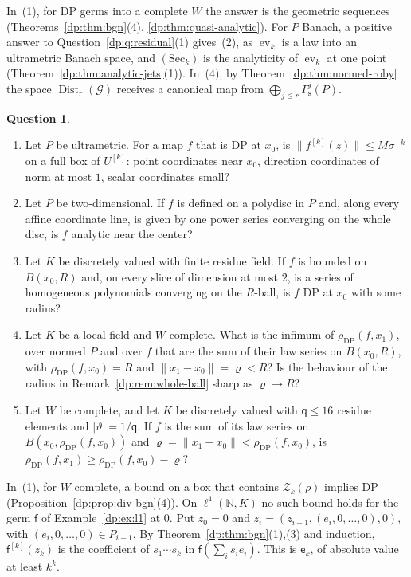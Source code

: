 \documentclass[11pt]{amsart}
\theoremstyle{definition}
\theoremstyle{remark}
\numberwithin{equation}{section}
\newcommand{\N}{\mathbb N}
\newcommand{\abs}[1]{\lvert #1\rvert}
\newcommand{\norm}[1]{\lVert #1\rVert}
\theoremstyle{plain}
\theoremstyle{definition}
\newtheorem{question}[theorem]{Question}
\theoremstyle{plain}
\newcommand{\ev}{\operatorname{ev}}
\newcommand{\cG}{\mathcal G}
\begin{document}
In~(1), for DP germs into a complete $W$ the answer is the geometric sequences (Theorems~\ref{dp:thm:bgn}(4), \ref{dp:thm:quasi-analytic}). For $P$ Banach, a positive answer to Question~\ref{dp:q:residual}(1) gives~(2), as $\ev_k$ is a law into an ultrametric Banach space, and $(\mathrm{Sec}_k)$ is the analyticity of $\ev_k$ at one point (Theorem~\ref{dp:thm:analytic-jets}(1)). In~(4), by Theorem~\ref{dp:thm:normed-roby} the space $\operatorname{Dist}_r(\cG)$ receives a canonical map from $\bigoplus_{j\le r}\Gamma^j_{\mathrm s}(P)$.

\begin{question}\label{dp:q:quotients}
\leavevmode
\begin{enumerate}
\item Let $P$ be ultrametric. For a map $f$ that is DP at $x_0$, is $\norm{f^{[k]}(z)}\le M\sigma^{-k}$ on a full box of $U^{[k]}$: point coordinates near $x_0$, direction coordinates of norm at most $1$, scalar coordinates small?
\item Let $P$ be two-dimensional. If $f$ is defined on a polydisc in $P$ and, along every affine coordinate line, is given by one power series converging on the whole disc, is $f$ analytic near the center?
\item Let $K$ be discretely valued with finite residue field. If $f$ is bounded on $B(x_0,R)$ and, on every slice of dimension at most $2$, is a series of homogeneous polynomials converging on the $R$-ball, is $f$ DP at $x_0$ with some radius?
\item Let $K$ be a local field and $W$ complete. What is the infimum of $\rho_{\mathrm{DP}}(f,x_1)$, over normed $P$ and over $f$ that are the sum of their law series on $B(x_0,R)$, with $\rho_{\mathrm{DP}}(f,x_0)=R$ and $\norm{x_1-x_0}=\varrho<R$? Is the behaviour of the radius in Remark~\ref{dp:rem:whole-ball} sharp as $\varrho\to R$?
\item Let $W$ be complete, and let $K$ be discretely valued with $\mathsf q\le16$ residue elements and $\abs\vartheta=1/\mathsf q$. If $f$ is the sum of its law series on $B(x_0,\rho_{\mathrm{DP}}(f,x_0))$ and $\varrho=\norm{x_1-x_0}<\rho_{\mathrm{DP}}(f,x_0)$, is $\rho_{\mathrm{DP}}(f,x_1)\ge\rho_{\mathrm{DP}}(f,x_0)-\varrho$?
\end{enumerate}
\end{question}

In~(1), for $W$ complete, a bound on a box that contains $\mathcal Z_k(\rho)$ implies DP (Proposition~\ref{dp:prop:div-bgn}(4)). On $\ell^1(\N,K)$ no such bound holds for the germ $\mathsf f$ of Example~\ref{dp:ex:l1} at $0$. Put $z_0=0$ and $z_i=(z_{i-1},(e_i,0,\dots,0),0)$, with $(e_i,0,\dots,0)\in P_{i-1}$. By Theorem~\ref{dp:thm:bgn}(1),(3) and induction, $\mathsf f^{[k]}(z_k)$ is the coefficient of $s_1\cdots s_k$ in $\mathsf f(\sum_is_ie_i)$. This is $\mathsf e_k$, of absolute value at least $k^k$.
\end{document}
